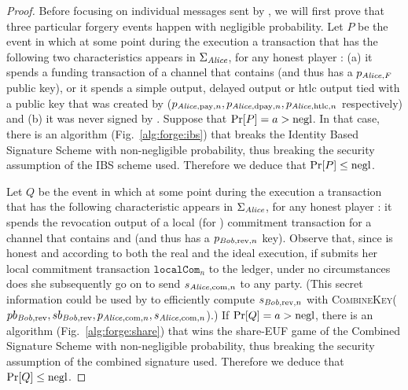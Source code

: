\begin{proof}
  Before focusing on individual messages sent by \environment, we will first
  prove that three particular forgery events happen with negligible probability.
  Let $P$ be the event in which at some point during the execution a transaction
  that has the following two characteristics appears in $\Sigma_{\mathit{Alice}}$, for
  any honest player \alice: (a) it spends a funding transaction of a channel
  that contains \alice{} (and thus has a $p_{\mathit{Alice}, F}$ public key), or it
  spends a simple output, delayed output or htlc output tied with a public key
  that was created by \alice{} ($p_{\mathit{Alice}, \mathrm{pay}, n}, p_{\mathit{Alice},
  \mathrm{dpay}, n}, p_{\mathit{Alice}, \mathrm{htlc}, n}$ respectively) and (b) it was
  never signed by \alice. Suppose that $\Pr[P] = a > \text{negl}$. In that case, there
  is an algorithm (Fig.~\ref{alg:forge:ibs}) that breaks the Identity Based
  Signature Scheme with non-negligible probability, thus breaking the security
  assumption of the IBS scheme used. Therefore we deduce that $\Pr[P] \leq
  \text{negl}$.

  Let $Q$ be the event in which at some point during the execution a transaction
  that has the following characteristic appears in $\Sigma_{\mathit{Alice}}$, for any
  honest player \alice: it spends the revocation output of a local (for
  \alice{}) commitment transaction for a channel that contains \alice{} and
  \bob{} (and thus has a $p_{\mathit{Bob}, \mathrm{rev}, n}$ key). Observe that, since
  \alice{} is honest and according to both the real and the ideal execution, if
  \alice{} submits her local commitment transaction $\mathtt{localCom}_n$ to the
  ledger, under no circumstances does she subsequently go on to send $s_{\mathit{Alice},
  \mathrm{com}, n}$ to any party. (This secret information could be used by
  \bob{} to efficiently compute $s_{\mathit{Bob}, \mathrm{rev}, n}$ with
  \textsc{CombineKey}($pb_{\mathit{Bob}, \mathrm{rev}}, sb_{\mathit{Bob}, \mathrm{rev}},
  p_{\mathit{Alice}, \mathrm{com}, n}, s_{\mathit{Alice}, \mathrm{com}, n}$).) If $\Pr[Q] = a >
  \text{negl}$, there is an algorithm (Fig.~\ref{alg:forge:share}) that wins the
  \textsf{share-EUF} game of the Combined Signature Scheme with non-negligible
  probability, thus breaking the security assumption of the combined signature
  used. Therefore we deduce that $\Pr[Q] \leq \text{negl}$.


\end{proof}
